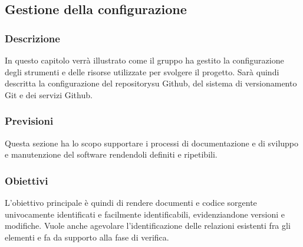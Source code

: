\subsection{Gestione della configurazione}
	\subsubsection{Descrizione}
		In questo capitolo verrà illustrato come il gruppo ha gestito la configurazione degli strumenti e delle risorse utilizzate per svolgere il progetto.
		Sarà quindi descritta la configurazione del repository\glosp su Github, del sistema di versionamento Git e dei servizi Github.
	\subsubsection{Previsioni}
		Questa sezione ha lo scopo supportare i processi di documentazione e di sviluppo e manutenzione del software rendendoli definiti e ripetibili.  
	\subsubsection{Obiettivi} 
		L'obiettivo principale è quindi di rendere documenti e codice sorgente univocamente identificati e facilmente identificabili, evidenziandone versioni e modifiche. Vuole anche agevolare l'identificazione delle relazioni esistenti fra gli elementi e fa da supporto alla fase di verifica.
